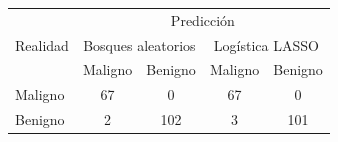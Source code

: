 \begin{tabular*}{\textwidth}{@{\extracolsep{\fill}}lcccc}
\toprule
\multirow{3}{3em}{Realidad}  & \multicolumn{4}{c}{Predicción} \\
          & \multicolumn{2}{c}{Bosques aleatorios} & \multicolumn{2}{c}{Logística LASSO} \\
            \cmidrule{2-5}
          & Maligno & Benigno  & Maligno & Benigno \\
\midrule
Maligno   & 67      & 0        & 67      & 0 \\
Benigno   & 2       & 102      & 3       & 101 \\
\bottomrule
\end{tabular*}
